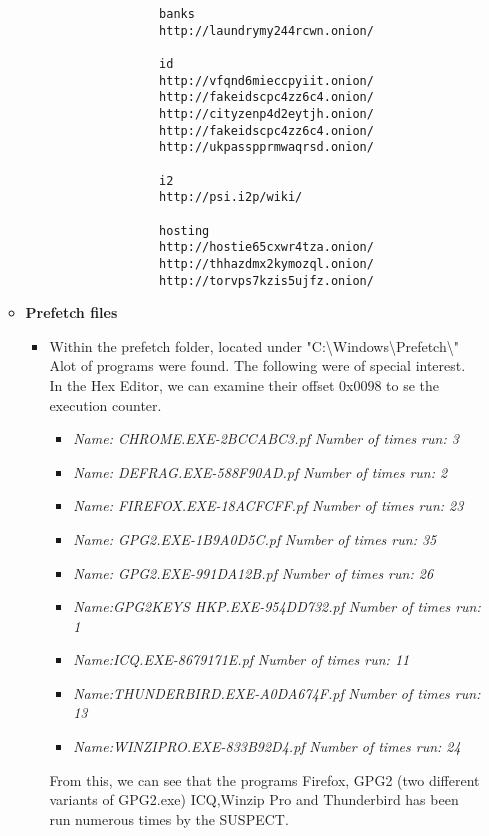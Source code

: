 \begin{enumerate}
\begin{itemize}
\begin{itemize}
\begin{itemize}
\begin{verbatim}
			banks
			http://laundrymy244rcwn.onion/
			
			id
			http://vfqnd6mieccpyiit.onion/
			http://fakeidscpc4zz6c4.onion/
			http://cityzenp4d2eytjh.onion/
			http://fakeidscpc4zz6c4.onion/
			http://ukpasspprmwaqrsd.onion/
			
			i2
			http://psi.i2p/wiki/
			
			hosting
			http://hostie65cxwr4tza.onion/
			http://thhazdmx2kymozql.onion/
			http://torvps7kzis5ujfz.onion/
			\end{verbatim}
		\end{itemize}
		
		
	\end{itemize}
	
	\newpage
	\item{\textbf{Prefetch files}}
	\begin{itemize}
			\item Within the prefetch folder, located under "C:\textbackslash Windows\textbackslash Prefetch\textbackslash" Alot of programs were found. The following were of special interest. In the Hex Editor, we can examine their offset 0x0098 to se the execution counter.
			
			\begin{itemize}
				\item \textit{Name: CHROME.EXE-2BCCABC3.pf}   \textit{Number of times run: 3}		
				\item \textit{Name: DEFRAG.EXE-588F90AD.pf}   \textit{Number of times run: 2}
				\item \textit{Name: FIREFOX.EXE-18ACFCFF.pf}   \textit{Number of times run: 23}
				\item \textit{Name: GPG2.EXE-1B9A0D5C.pf}   \textit{Number of times run: 35}
				\item \textit{Name: GPG2.EXE-991DA12B.pf}  	\textit{Number of times run: 26}
				\item \textit{Name:GPG2KEYS \textunderscore HKP.EXE-954DD732.pf}   \textit{Number of times run: 1}
				\item \textit{Name:ICQ.EXE-8679171E.pf}   	\textit{Number of times run: 11}
				\item \textit{Name:THUNDERBIRD.EXE-A0DA674F.pf}   \textit{Number of times run: 13}
				\item \textit{Name:WINZIPRO.EXE-833B92D4.pf}  	\textit{Number of times run: 24}
				
			\end{itemize}
			
			From this, we can see that the programs Firefox, GPG2 (two different variants of GPG2.exe) ICQ,Winzip Pro and Thunderbird has been run numerous times by the SUSPECT.
			

\end{itemize}
\end{itemize}
\end{enumerate}
